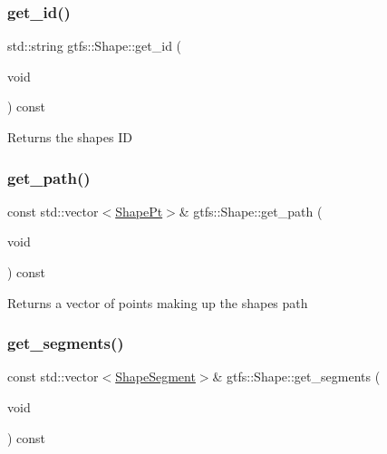 \subsubsection{\texorpdfstring{get\+\_\+id()}{get\_id()}}
{\footnotesize\ttfamily std\+::string gtfs\+::\+Shape\+::get\+\_\+id (\begin{DoxyParamCaption}\item[{void}]{ }\end{DoxyParamCaption}) const\hspace{0.3cm}{\ttfamily [inline]}}

\begin{DoxyReturn}{Returns}
the shape\textquotesingle{}s ID 
\end{DoxyReturn}
\mbox{\label{classgtfs_1_1Shape_a3b9c24a3ec0de99e4e7ac2fe2bb128a0}} 
\subsubsection{\texorpdfstring{get\+\_\+path()}{get\_path()}}
{\footnotesize\ttfamily const std\+::vector$<$\hyperlink{structgtfs_1_1ShapePt}{Shape\+Pt}$>$\& gtfs\+::\+Shape\+::get\+\_\+path (\begin{DoxyParamCaption}\item[{void}]{ }\end{DoxyParamCaption}) const\hspace{0.3cm}{\ttfamily [inline]}}

\begin{DoxyReturn}{Returns}
a vector of points making up the shape\textquotesingle{}s path 
\end{DoxyReturn}
\mbox{\label{classgtfs_1_1Shape_ab6959c8c957c2548313e4cf76bd2a2dd}} 
\subsubsection{\texorpdfstring{get\+\_\+segments()}{get\_segments()}}
{\footnotesize\ttfamily const std\+::vector$<$\hyperlink{structgtfs_1_1ShapeSegment}{Shape\+Segment}$>$\& gtfs\+::\+Shape\+::get\+\_\+segments (\begin{DoxyParamCaption}\item[{void}]{ }\end{DoxyParamCaption}) const\hspace{0.3cm}{\ttfamily [inline]}}

